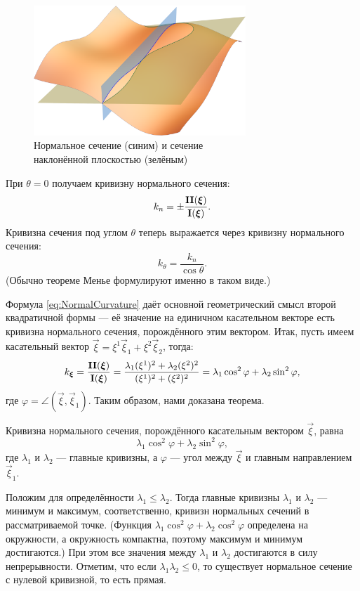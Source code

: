 \begin{figure}[H]
	\centering
	\includegraphics[width=8cm]{./img/ThetaSection.pdf}
	\caption{Нормальное сечение (синим) и сечение\\ наклонённой плоскостью (зелёным)}
\end{figure}

\noindent%
При $\theta = 0$ получаем кривизну нормального сечения:
\begin{equation} \label{eq:NormalCurvature}
	k_n = \pm\frac{\boldsymbol{\operatorname{II}}(\boldsymbol{\xi})}{\boldsymbol{\operatorname{I}}(\boldsymbol{\xi})}.
\end{equation}
Кривизна сечения под углом $\theta$ теперь выражается через кривизну нормального сечения:
\[
	k_{\theta} = \frac{k_n}{\cos\theta}.
\]
(Обычно теореме Менье формулируют именно в таком виде.)

Формула \ref{eq:NormalCurvature} даёт основной геометрический смысл второй квадратичной формы --- её значение на единичном касательном векторе есть кривизна нормального сечения, порождённого этим вектором. Итак, пусть имеем касательный вектор $\vec{\xi} = \xi^1\vec{\xi}_1 + \xi^2\vec{\xi}_2$, тогда:
\[
	k_{\boldsymbol{\xi}} = \frac{\boldsymbol{\operatorname{II}}(\boldsymbol{\xi})}{\boldsymbol{\operatorname{I}}(\boldsymbol{\xi})} = \frac{\lambda_1(\xi^1)^2 + \lambda_2(\xi^2)^2}{(\xi^1)^2 + (\xi^2)^2} = \lambda_1\cos^2\varphi + \lambda_2\sin^2\varphi,
\]
где $\varphi = \angle(\vec{\xi}, \vec{\xi}_1)$. Таким образом, нами доказана теорема.

\begin{theorem} \label{theorem:EulerFormula}
	Кривизна нормального сечения, порождённого касательным вектором $\vec{\xi}$, равна
	\[
		\lambda_1\cos^2\varphi + \lambda_2\sin^2\varphi,
	\]
	где $\lambda_1$ и $\lambda_2$ --- главные кривизны, а $\varphi$ --- угол между $\vec{\xi}$ и главным направлением $\vec{\xi}_1$.
\end{theorem}

Положим для определённости $\lambda_1 \leqslant \lambda_2$. Тогда главные кривизны $\lambda_1$ и $\lambda_2$ --- минимум и максимум, соответственно, кривизн нормальных сечений в рассматриваемой точке. (Функция $\lambda_1\cos^2\varphi + \lambda_2\cos^2\varphi$ определена на окружности, а окружность компактна, поэтому максимум и минимум достигаются.) При этом все значения между $\lambda_1$ и $\lambda_2$ достигаются в силу непрерывности. Отметим, что если $\lambda_1\lambda_2 \leqslant 0$, то существует нормальное сечение с нулевой кривизной, то есть прямая.

